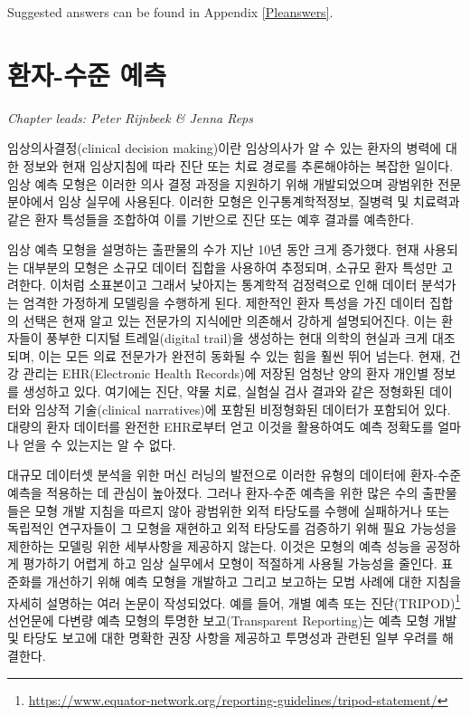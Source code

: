 \documentclass[11pt]{book}
\let\rmarkdownfootnote\footnote%
\def\footnote{\protect\rmarkdownfootnote}
\theoremstyle{definition}
\theoremstyle{definition}
\theoremstyle{definition}
\theoremstyle{remark}
\begin{document}
Suggested answers can be found in Appendix \ref{Pleanswers}.

\chapter{환자-수준 예측}\label{PatientLevelPrediction}

\emph{Chapter leads: Peter Rijnbeek \& Jenna Reps}


임상의사결정(clinical decision making)이란 임상의사가 알 수 있는 환자의
병력에 대한 정보와 현재 임상지침에 따라 진단 또는 치료 경로를
추론해야하는 복잡한 일이다. 임상 예측 모형은 이러한 의사 결정 과정을
지원하기 위해 개발되었으며 광범위한 전문 분야에서 임상 실무에 사용된다.
이러한 모형은 인구통계학적정보, 질병력 및 치료력과 같은 환자 특성들을
조합하여 이를 기반으로 진단 또는 예후 결과를 예측한다.
 

임상 예측 모형을 설명하는 출판물의 수가 지난 10년 동안 크게 증가했다.
현재 사용되는 대부분의 모형은 소규모 데이터 집합을 사용하여 추정되며,
소규모 환자 특성만 고려한다. 이처럼 소표본이고 그래서 낮아지는 통계학적
검정력으로 인해 데이터 분석가는 엄격한 가정하게 모델링을 수행하게 된다.
제한적인 환자 특성을 가진 데이터 집합의 선택은 현재 알고 있는 전문가의
지식에만 의존해서 강하게 설명되어진다. 이는 환자들이 풍부한 디지털
트레일(digital trail)을 생성하는 현대 의학의 현실과 크게 대조되며, 이는
모든 의료 전문가가 완전히 동화될 수 있는 힘을 훨씬 뛰어 넘는다. 현재,
건강 관리는 EHR(Electronic Health Records)에 저장된 엄청난 양의 환자
개인별 정보를 생성하고 있다. 여기에는 진단, 약물 치료, 실험실 검사
결과와 같은 정형화된 데이터와 임상적 기술(clinical narratives)에 포함된
비정형화된 데이터가 포함되어 있다. 대량의 환자 데이터를 완전한 EHR로부터
얻고 이것을 활용하여도 예측 정확도를 얼마나 얻을 수 있는지는 알 수 없다.

대규모 데이터셋 분석을 위한 머신 러닝의 발전으로 이러한 유형의 데이터에
환자-수준 예측을 적용하는 데 관심이 높아졌다. 그러나 환자-수준 예측을
위한 많은 수의 출판물들은 모형 개발 지침을 따르지 않아 광범위한 외적
타당도를 수행에 실패하거나 또는 독립적인 연구자들이 그 모형을 재현하고
외적 타당도를 검증하기 위해 필요 가능성을 제한하는 모델링 위한
세부사항을 제공하지 않는다. 이것은 모형의 예측 성능을 공정하게 평가하기
어렵게 하고 임상 실무에서 모형이 적절하게 사용될 가능성을 줄인다.
표준화를 개선하기 위해 예측 모형을 개발하고 그리고 보고하는 모범 사례에
대한 지침을 자세히 설명하는 여러 논문이 작성되었다. 예를 들어, 개별 예측
또는 진단(TRIPOD)\footnote{\url{https://www.equator-network.org/reporting-guidelines/tripod-statement/}}
선언문에 다변량 예측 모형의 투명한 보고(Transparent Reporting)는 예측
모형 개발 및 타당도 보고에 대한 명확한 권장 사항을 제공하고 투명성과
관련된 일부 우려를 해결한다.  
\end{document}
